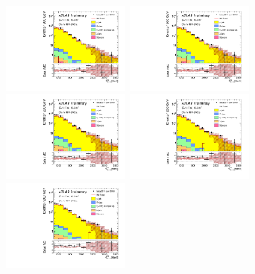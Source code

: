 \begin{figure}[tbph]
\begin{center}
\includegraphics[width=0.35\textwidth]{figures/ATLAS-CONF-2016-078_INT/N-1Plots/AtlasStyle/Preliminary/CRY_SRJigsawSRG1a_LastCut_CRY_minusone}
\includegraphics[width=0.35\textwidth]{figures/ATLAS-CONF-2016-078_INT/N-1Plots/AtlasStyle/Preliminary/CRY_SRJigsawSRG1b_LastCut_CRY_minusone}
\includegraphics[width=0.35\textwidth]{figures/ATLAS-CONF-2016-078_INT/N-1Plots/AtlasStyle/Preliminary/CRY_SRJigsawSRG2a_LastCut_CRY_minusone}
\includegraphics[width=0.35\textwidth]{figures/ATLAS-CONF-2016-078_INT/N-1Plots/AtlasStyle/Preliminary/CRY_SRJigsawSRG2b_LastCut_CRY_minusone}
\includegraphics[width=0.35\textwidth]{figures/ATLAS-CONF-2016-078_INT/N-1Plots/AtlasStyle/Preliminary/CRY_SRJigsawSRG3a_LastCut_CRY_minusone}

\end{center}
\end{figure}
